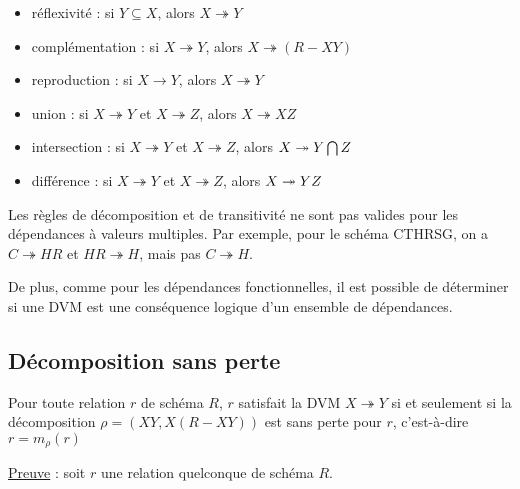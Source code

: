 		
		\begin{itemize}
			\item réflexivité : si $Y \subseteq X$, alors $X \twoheadrightarrow Y$
			\item complémentation : si $X \twoheadrightarrow Y$, alors $X \twoheadrightarrow (R - XY )$
			\item reproduction : si $X \rightarrow Y$, alors $X \twoheadrightarrow Y$
			\item union : si $X \twoheadrightarrow Y$ et $X \twoheadrightarrow Z$, alors $X \twoheadrightarrow XZ$
			\item intersection : si $X \twoheadrightarrow Y$ et $X \twoheadrightarrow Z$, alors $X \twoheadrightarrow Y \bigcap Z$
			\item différence : si $X \twoheadrightarrow Y$ et $X \twoheadrightarrow Z$, alors $X \twoheadrightarrow Y \\ Z$
		\end{itemize}
		
		Les règles de décomposition et de transitivité ne sont pas valides pour les dépendances à valeurs multiples. Par exemple, pour le schéma CTHRSG, on a $C \twoheadrightarrow HR$ et $HR \twoheadrightarrow H$, mais pas $C \twoheadrightarrow H$.
		
		De plus, comme pour les dépendances fonctionnelles, il est possible de déterminer si une DVM est une conséquence logique d'un ensemble de dépendances.
		
		
		\subsection{Décomposition sans perte}
		
		Pour toute relation $r$ de schéma $R$, $r$ satisfait la DVM $X \twoheadrightarrow Y$ si et seulement si la décomposition $\rho = (XY, X(R - XY))$ est sans perte pour $r$, c'est-à-dire $r = m_\rho (r)$
		
		\underline{Preuve} : soit $r$ une relation quelconque de schéma $R$.
		
